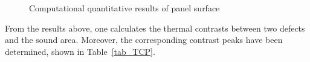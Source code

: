 \documentclass{tQRT2e}
\begin{document}
\begin{figure}
    \hspace{-18pt}
    \hspace{6pt}
	\caption{Computational quantitative results of panel surface}
	\label{sim_fig}
\end{figure}
From the results above, one calculates the thermal contrasts between two defects and the sound area. Moreover, the corresponding contrast peaks have been determined, shown in Table~\ref{tab_TCP}.
\end{document}
